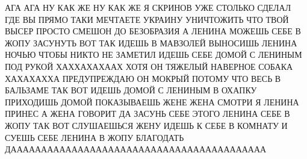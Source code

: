  
 
 
 
 

АГА АГА НУ КАК ЖЕ НУ КАК ЖЕ Я СКРИНОВ УЖЕ СТОЛЬКО СДЕЛАЛ ГДЕ ВЫ ПРЯМО ТАКИ
МЕЧТАЕТЕ УКРАИНУ УНИЧТОЖИТЬ ЧТО ТВОЙ ВЫСЕР ПРОСТО СМЕШОН ДО БЕЗОБРАЗИЯ А ЛЕНИНА
МОЖЕШЬ СЕБЕ В ЖОПУ ЗАСУНУТЬ ВОТ ТАК ИДЕШЬ В МАВЗОЛЕЙ ВЫНОСИШЬ ЛЕНИНА НОЧЬЮ
ЧТОБЫ НИКТО НЕ ЗАМЕТИЛ ИДЕШЬ СЕБЕ ДОМОЙ С ЛЕНИНЫМ ПОД РУКОЙ ХАХХАХАХААХ ХОТЯ ОН
ТЯЖЕЛЫЙ НАВЕРНОЕ СОБАКА ХАХАХАХХА ПРЕДУПРЕЖДАЮ ОН МОКРЫЙ ПОТОМУ ЧТО ВЕСЬ В
БАЛЬЗАМЕ ТАК ВОТ ИДЕШЬ ДОМОЙ С ЛЕНИНЫМ В ОХАПКУ ПРИХОДИШЬ ДОМОЙ ПОКАЗЫВАЕШЬ
ЖЕНЕ ЖЕНА СМОТРИ Я ЛЕНИНА ПРИНЕС А ЖЕНА ГОВОРИТ ДА ЗАСУНЬ СЕБЕ ЭТОГО ЛЕНИНА
СЕБЕ В ЖОПУ ТАК ВОТ СЛУШАЕШЬСЯ ЖЕНУ ИДЕШЬ К СЕБЕ В КОМНАТУ И СУЕШЬ СЕБЕ ЛЕНИНА
В ЖОПУ БЛАГОДАТЬ ДАААААААААААААААААААААААААААААААААААААААААА
